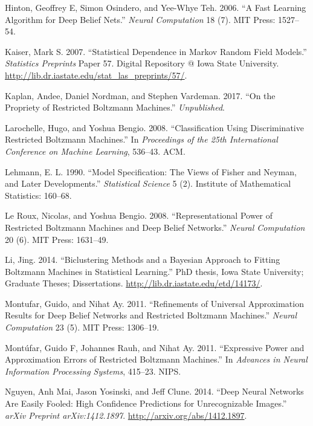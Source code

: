\documentclass[]{article}
\theoremstyle{definition}
\begin{document}
\leavevmode\hypertarget{ref-hinton2006fast}{}%
Hinton, Geoffrey E, Simon Osindero, and Yee-Whye Teh. 2006. ``A Fast
Learning Algorithm for Deep Belief Nets.'' \emph{Neural Computation} 18
(7). MIT Press: 1527--54.

\leavevmode\hypertarget{ref-kaiser2007statistical}{}%
Kaiser, Mark S. 2007. ``Statistical Dependence in Markov Random Field
Models.'' \emph{Statistics Preprints} Paper 57. Digital Repository @
Iowa State University.
\url{http://lib.dr.iastate.edu/stat_las_preprints/57/}.

\leavevmode\hypertarget{ref-kaplan2016propriety}{}%
Kaplan, Andee, Daniel Nordman, and Stephen Vardeman. 2017. ``On the
Propriety of Restricted Boltzmann Machines.'' \emph{Unpublished}.

\leavevmode\hypertarget{ref-larochelle2008classification}{}%
Larochelle, Hugo, and Yoshua Bengio. 2008. ``Classification Using
Discriminative Restricted Boltzmann Machines.'' In \emph{Proceedings of
the 25th International Conference on Machine Learning}, 536--43. ACM.

\leavevmode\hypertarget{ref-lehmann1990model}{}%
Lehmann, E. L. 1990. ``Model Specification: The Views of Fisher and
Neyman, and Later Developments.'' \emph{Statistical Science} 5 (2).
Institute of Mathematical Statistics: 160--68.

\leavevmode\hypertarget{ref-le2008representational}{}%
Le Roux, Nicolas, and Yoshua Bengio. 2008. ``Representational Power of
Restricted Boltzmann Machines and Deep Belief Networks.'' \emph{Neural
Computation} 20 (6). MIT Press: 1631--49.

\leavevmode\hypertarget{ref-li2014biclustering}{}%
Li, Jing. 2014. ``Biclustering Methods and a Bayesian Approach to
Fitting Boltzmann Machines in Statistical Learning.'' PhD thesis, Iowa
State University; Graduate Theses; Dissertations.
\url{http://lib.dr.iastate.edu/etd/14173/}.

\leavevmode\hypertarget{ref-montufar2011refinements}{}%
Montufar, Guido, and Nihat Ay. 2011. ``Refinements of Universal
Approximation Results for Deep Belief Networks and Restricted Boltzmann
Machines.'' \emph{Neural Computation} 23 (5). MIT Press: 1306--19.

\leavevmode\hypertarget{ref-montufar2011expressive}{}%
Montúfar, Guido F, Johannes Rauh, and Nihat Ay. 2011. ``Expressive Power
and Approximation Errors of Restricted Boltzmann Machines.'' In
\emph{Advances in Neural Information Processing Systems}, 415--23. NIPS.

\leavevmode\hypertarget{ref-nguyen2014deep}{}%
Nguyen, Anh Mai, Jason Yosinski, and Jeff Clune. 2014. ``Deep Neural
Networks Are Easily Fooled: High Confidence Predictions for
Unrecognizable Images.'' \emph{arXiv Preprint arXiv:1412.1897}.
\url{http://arxiv.org/abs/1412.1897}.
\end{document}
